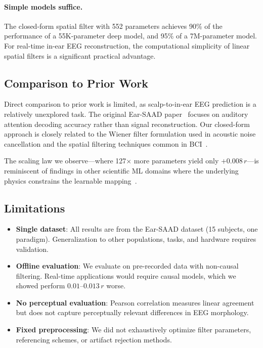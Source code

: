 \documentclass[conference]{IEEEtran}
\begin{document}
\paragraph{Simple models suffice.} The closed-form spatial filter with 552 parameters achieves 90\% of the performance of a 55K-parameter deep model, and 95\% of a 7M-parameter model. For real-time in-ear EEG reconstruction, the computational simplicity of linear spatial filters is a significant practical advantage.

\subsection{Comparison to Prior Work}

Direct comparison to prior work is limited, as scalp-to-in-ear EEG prediction is a relatively unexplored task. The original Ear-SAAD paper~\cite{ear_saad} focuses on auditory attention decoding accuracy rather than signal reconstruction. Our closed-form approach is closely related to the Wiener filter formulation used in acoustic noise cancellation and the spatial filtering techniques common in BCI~\cite{blankertz2008csp}.

The scaling law we observe---where 127$\times$ more parameters yield only $+0.008\,r$---is reminiscent of findings in other scientific ML domains where the underlying physics constrains the learnable mapping~\cite{kaplan2020scaling}.

\subsection{Limitations}

\begin{itemize}
    \item \textbf{Single dataset}: All results are from the Ear-SAAD dataset (15 subjects, one paradigm). Generalization to other populations, tasks, and hardware requires validation.
    \item \textbf{Offline evaluation}: We evaluate on pre-recorded data with non-causal filtering. Real-time applications would require causal models, which we showed perform $0.01$--$0.013\,r$ worse.
    \item \textbf{No perceptual evaluation}: Pearson correlation measures linear agreement but does not capture perceptually relevant differences in EEG morphology.
    \item \textbf{Fixed preprocessing}: We did not exhaustively optimize filter parameters, referencing schemes, or artifact rejection methods.
\end{itemize}
\end{document}
